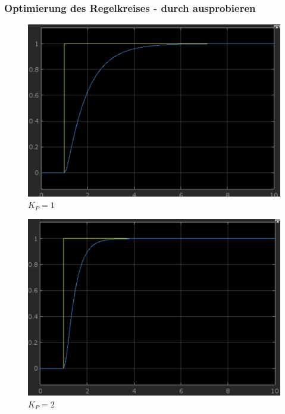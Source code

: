 \documentclass{article}
\begin{document}
			\subsubsection{Optimierung des Regelkreises - durch ausprobieren}
				\begin{figure}[h]
					\includegraphics[scale=0.2325, center]{2_b_2_KP_1.png}
					\caption{$K_P = 1$}
					\label{fig5: Graph_KP_1}
				\end{figure}
				\begin{figure}[h]
					\includegraphics[scale=0.2325, center]{2_b_2_KP_2.png}
					\caption{$K_P = 2$}
					\label{fig6: Graph_KP_2}
				\end{figure}	
\newpage
\end{document}
